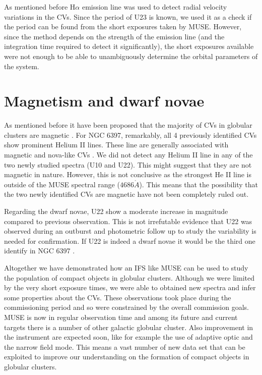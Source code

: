 As mentioned before H$\alpha$ emission line was used to detect radial velocity variations in the CVs. Since the period of U23 is known, we used it as a check if the period can be found from the short exposures taken by MUSE. However, since the method depends on the strength of the emission line (and the integration time required to detect it significantly), the short exposures available were not enough to be able to unambiguously determine the orbital parameters of the system.


\section{Magnetism and dwarf novae}
 As mentioned before it have been proposed that the majority of CVs in globular clusters are magnetic \citep{grindlay_magnetic_1999}. For NGC 6397, remarkably, all 4 previously identified CVs show prominent Helium II lines. These line are generally associated with magnetic and nova-like CVs \citep{echevarria_statistical_1988}. We did not detect any Helium II line in any of the two newly studied spectra (U10 and U22). This might suggest that they are not magnetic in nature. However, this is not conclusive as the strongest He II line is outside of the MUSE spectral range ($4686 \mathring{A}$). This means that the possibility that the two newly identified CVs are magnetic have not been completely ruled out. 

Regarding the dwarf novae, U22 show a moderate increase in magnitude compared to previous observation. This is not irrefutable evidence that U22 was observed during an outburst and photometric follow up to study the variability is needed for confirmation. If U22 is indeed a dwarf novae it would be the third one identify in NGC 6397 \citep{shara_erupting_2005}.  

Altogether we have demonstrated how an IFS like MUSE can be used to study the population of compact objects in globular clusters. Although we were limited by the very short exposure times, we were able to obtained new spectra and infer some properties about the CVs. These observations took place during the commissioning period and so were constrained by the overall commission goals. MUSE is now in regular observation time and among its future and current targets there is a number of other galactic globular cluster. Also improvement in the instrument are expected soon, like for example the use of adaptive optic and the narrow field mode. This means  a vast number of new data set that can be exploited to improve our understanding on the formation of compact objects in globular clusters. 

